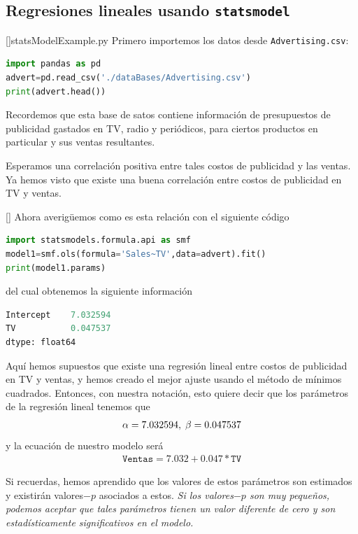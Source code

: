 \subsection{Regresiones lineales usando \texttt{statsmodel}}
[]{statsModelExample.py}
Primero importemos los datos desde \texttt{Advertising.csv}:
\begin{lstlisting}[language=Python]
import pandas as pd
advert=pd.read_csv('./dataBases/Advertising.csv')
print(advert.head())
\end{lstlisting}



Recordemos que esta base de satos contiene información de presupuestos de publicidad gastados en TV, radio y periódicos, para ciertos productos en particular y sus ventas resultantes.


Esperamos una correlación positiva entre tales costos de publicidad y las ventas. Ya hemos visto que existe una buena correlación entre costos de publicidad en TV y ventas.

[]{}
Ahora averigüemos como es esta relación con el siguiente código
\begin{lstlisting}[language=Python]
import statsmodels.formula.api as smf
model1=smf.ols(formula='Sales~TV',data=advert).fit()
print(model1.params)
\end{lstlisting}
del cual obtenemos la siguiente información
\begin{lstlisting}[language=Python]
Intercept    7.032594
TV           0.047537
dtype: float64
\end{lstlisting}



Aquí hemos supuestos que existe una regresión lineal entre costos de publicidad en TV y ventas, y hemos creado el mejor ajuste usando el método de mínimos cuadrados. Entonces, con nuestra notación, esto quiere decir que los parámetros de la regresión lineal tenemos que
\begin{align}
 \alpha = 7.032594, \; \beta= 0.047537
\end{align}
y la ecuación de nuestro modelo será
\begin{align}
 \texttt{Ventas} = 7.032 + 0.047*\texttt{TV}
\end{align}


Si recuerdas, hemos aprendido que los valores de estos parámetros son estimados y existirán valores$-p$ asociados a estos. \emph{Si los valores$-p$ son muy pequeños, podemos aceptar que tales parámetros tienen un valor diferente de cero y son estadísticamente significativos en el modelo.}

